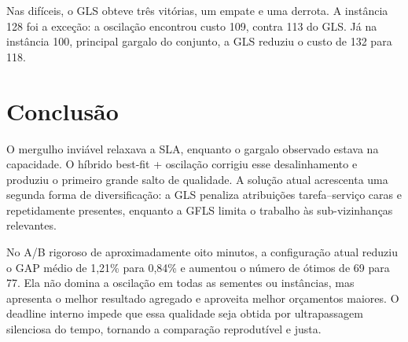 \documentclass{article}
\begin{document}
Nas difíceis, o GLS obteve três vitórias, um empate e uma derrota. A instância
128 foi a exceção: a oscilação encontrou custo 109, contra 113 do GLS. Já na
instância 100, principal gargalo do conjunto, a GLS reduziu o custo de 132 para
118.

\section{Conclusão}

O mergulho inviável relaxava a SLA, enquanto o gargalo observado estava na
capacidade. O híbrido best-fit + oscilação corrigiu esse desalinhamento e
produziu o primeiro grande salto de qualidade. A solução atual acrescenta uma
segunda forma de diversificação: a GLS penaliza atribuições tarefa--serviço
caras e repetidamente presentes, enquanto a GFLS limita o trabalho às
sub-vizinhanças relevantes.

No A/B rigoroso de aproximadamente oito minutos, a configuração atual reduziu
o GAP médio de 1,21\% para 0,84\% e aumentou o número de ótimos de 69 para 77.
Ela não domina a oscilação em todas as sementes ou instâncias, mas apresenta o
melhor resultado agregado e aproveita melhor orçamentos maiores. O deadline
interno impede que essa qualidade seja obtida por ultrapassagem silenciosa do
tempo, tornando a comparação reprodutível e justa.
\end{document}
